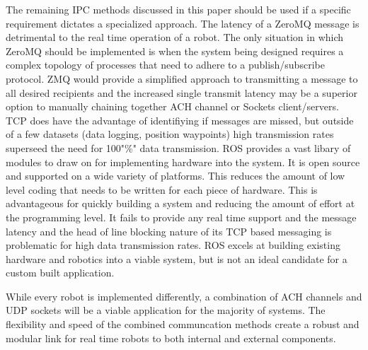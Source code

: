 The remaining IPC methods discussed in this paper should be used if a specific requirement dictates a specialized approach. The latency of a ZeroMQ message is detrimental to the real time operation of a robot. The only situation in which ZeroMQ should be implemented is when the system being designed requires a complex topology of processes that need to adhere to a publish/subscribe protocol. ZMQ would provide a simplified approach to transmitting a message to all desired recipients and the increased single transmit latency may be a superior option to manually chaining together ACH channel or Sockets client/servers. TCP does have the advantage of identifiying if messages are missed, but outside of a few datasets (data logging, position waypoints) high transmission rates superseed the need for 100"\%" data transmission. ROS provides a vast libary of modules to draw on for implementing hardware into the system. It is open source and supported on a wide variety of platforms. This reduces the amount of low level coding that needs to be written for each piece of hardware. This is advantageous for quickly building a system and reducing the amount of effort at the programming level. It fails to provide any real time support and the message latency and the head of line blocking nature of its TCP based messaging is problematic for high data transmission rates. ROS excels at building existing hardware and robotics into a viable system, but is not an ideal candidate for a custom built application.

While every robot is implemented differently, a combination of ACH channels and UDP sockets will be a viable application for the majority of systems. The flexibility and speed of the combined communcation methods create a robust and modular link for real time robots to both internal and external components. 
